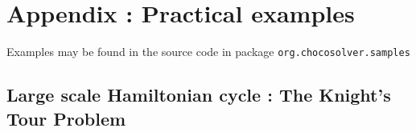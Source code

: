 \documentclass{article}
\begin{document}
%
%
%


\newpage{}
\section{Appendix : Practical examples}

Examples may be found in the source code in package \texttt{org.chocosolver.samples} 

\subsection{Large scale Hamiltonian cycle : The Knight's Tour Problem}
\end{document}
